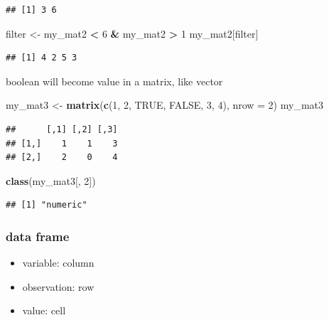 \documentclass[
]{book}
\newenvironment{Shaded}{\begin{snugshade}}{\end{snugshade}}
\newcommand{\AttributeTok}[1]{\textcolor[rgb]{0.13,0.29,0.53}{#1}}
\newcommand{\ConstantTok}[1]{\textcolor[rgb]{0.56,0.35,0.01}{#1}}
\newcommand{\DecValTok}[1]{\textcolor[rgb]{0.00,0.00,0.81}{#1}}
\newcommand{\FunctionTok}[1]{\textcolor[rgb]{0.13,0.29,0.53}{\textbf{#1}}}
\newcommand{\NormalTok}[1]{#1}
\newcommand{\OtherTok}[1]{\textcolor[rgb]{0.56,0.35,0.01}{#1}}
\newcommand{\SpecialCharTok}[1]{\textcolor[rgb]{0.81,0.36,0.00}{\textbf{#1}}}
\providecommand{\tightlist}{%
  \setlength{\itemsep}{0pt}\setlength{\parskip}{0pt}}
\theoremstyle{definition}
\theoremstyle{definition}
\theoremstyle{definition}
\theoremstyle{definition}
\theoremstyle{remark}
\begin{document}
\begin{verbatim}
## [1] 3 6
\end{verbatim}

\begin{Shaded}
\begin{Highlighting}[]
\NormalTok{filter }\OtherTok{\textless{}{-}}\NormalTok{ my\_mat2 }\SpecialCharTok{\textless{}} \DecValTok{6} \SpecialCharTok{\&}\NormalTok{ my\_mat2 }\SpecialCharTok{\textgreater{}} \DecValTok{1}
\NormalTok{my\_mat2[filter]}
\end{Highlighting}
\end{Shaded}

\begin{verbatim}
## [1] 4 2 5 3
\end{verbatim}

boolean will become value in a matrix, like vector

\begin{Shaded}
\begin{Highlighting}[]
\NormalTok{my\_mat3 }\OtherTok{\textless{}{-}} \FunctionTok{matrix}\NormalTok{(}\FunctionTok{c}\NormalTok{(}\DecValTok{1}\NormalTok{, }\DecValTok{2}\NormalTok{, }\ConstantTok{TRUE}\NormalTok{, }\ConstantTok{FALSE}\NormalTok{, }\DecValTok{3}\NormalTok{, }\DecValTok{4}\NormalTok{), }\AttributeTok{nrow =} \DecValTok{2}\NormalTok{)}
\NormalTok{my\_mat3}
\end{Highlighting}
\end{Shaded}

\begin{verbatim}
##      [,1] [,2] [,3]
## [1,]    1    1    3
## [2,]    2    0    4
\end{verbatim}

\begin{Shaded}
\begin{Highlighting}[]
\FunctionTok{class}\NormalTok{(my\_mat3[, }\DecValTok{2}\NormalTok{])}
\end{Highlighting}
\end{Shaded}

\begin{verbatim}
## [1] "numeric"
\end{verbatim}

\hypertarget{data-frame}{%
\subsubsection{data frame}\label{data-frame}}

\begin{itemize}
\tightlist
\item
  variable: column
\item
  observation: row
\item
  value: cell
\end{itemize}
\end{document}
